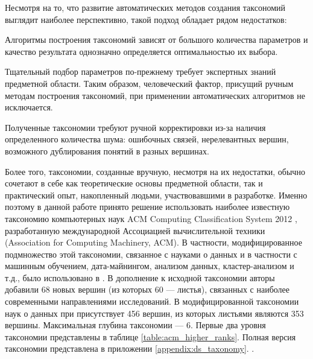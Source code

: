 \documentclass[12pt]{article}
\newenvironment{itemize*}%
{\begin{itemize}%
	\setlength{\itemsep}{0pt}%
	\setlength{\parskip}{0pt}}%
{\end{itemize}}
\begin{document}
Несмотря на то, что развитие автоматических методов создания таксономий выглядит наиболее перспективно, такой подход обладает рядом недостатков:
\begin{itemize*}
	\item Алгоритмы построения таксономий зависят от большого количества параметров и качество результата однозначно определяется оптимальностью их выбора.
	\item Тщательный подбор параметров по-прежнему требует экспертных знаний предметной области. Таким образом, человеческий фактор, присущий ручным методам построения таксономий, при применении автоматических алгоритмов не исключается.
	\item Полученные таксономии требуют ручной корректировки из-за наличия определенного количества шума: ошибочных связей, нерелевантных вершин, возможного дублирования понятий в разных вершинах.
\end{itemize*}
Более того, таксономии, созданные вручную, несмотря на их недостатки, обычно сочетают в себе как теоретические основы предметной области, так и практический опыт, накопленный людьми, участвовавшими в разработке. Именно поэтому в данной работе принято решение использовать наиболее известную таксономию компьютерных наук ACM Computing Classification System 2012 \cite{associationforcomputingmachinery}, разработанную международной Ассоциацией вычислительной техники (Association for Computing Machinery, ACM). В частности, модифицированное подмножество этой таксономии, связанное с науками о данных и в частности с машинным обучением, дата-майнингом, анализом данных, кластер-анализом и т.д., было использовано в \cite{mirkin2018preprint}. В дополнение к исходной таксономии авторы добавили 68 новых вершин (из которых 60 --- листья), связанных с наиболее современными направлениями исследований. В модифицированной таксономии наук о данных при присутствует 456 вершин, из которых листьями являются 353 вершины. Максимальная глубина таксономии --- 6. Первые два уровня таксономии представлены в таблице \ref{table:acm_higher_ranks}. Полная версия таксономии представлена в приложении \ref{appendix:ds_taxonomy}.
.
\end{document}
